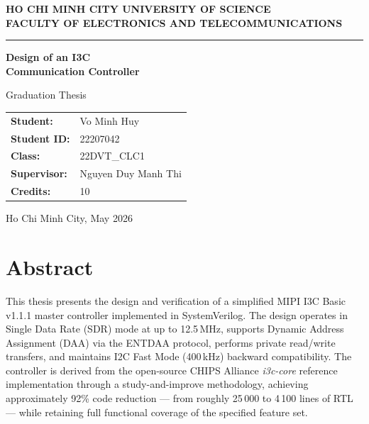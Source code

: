 \documentclass[12pt, a4paper, oneside]{report}
\begin{document}
\begin{titlepage}
\centering
\vspace*{1cm}

{\large\bfseries HO CHI MINH CITY UNIVERSITY OF SCIENCE\\
FACULTY OF ELECTRONICS AND TELECOMMUNICATIONS}

\vspace{0.5cm}
\rule{\linewidth}{0.5pt}

\vspace{2cm}
{\LARGE\bfseries Design of an I3C\\[0.3em] Communication Controller}

\vspace{0.5cm}
{\large Graduation Thesis}

\vspace{2cm}
\begin{tabular}{ll}
\textbf{Student:}    & Vo Minh Huy \\[4pt]
\textbf{Student ID:} & 22207042 \\[4pt]
\textbf{Class:}      & 22DVT\_CLC1 \\[4pt]
\textbf{Supervisor:} & Nguyen Duy Manh Thi \\[4pt]
\textbf{Credits:}    & 10 \\
\end{tabular}

\vfill
{\large Ho Chi Minh City, May 2026}
\end{titlepage}


\chapter*{Abstract}

This thesis presents the design and verification of a simplified MIPI I3C Basic v1.1.1
master controller implemented in SystemVerilog. The design operates in Single Data Rate
(SDR) mode at up to 12.5\,MHz, supports Dynamic Address Assignment (DAA) via the ENTDAA
protocol, performs private read/write transfers, and maintains I2C Fast Mode (400\,kHz)
backward compatibility. The controller is derived from the open-source CHIPS Alliance
\textit{i3c-core} reference implementation through a study-and-improve methodology,
achieving approximately 92\% code reduction --- from roughly 25\,000 to 4\,100 lines of
RTL --- while retaining full functional coverage of the specified feature set.
\end{document}

